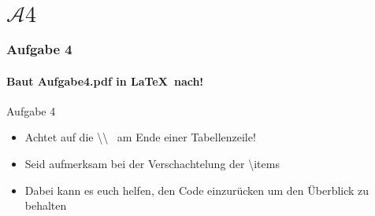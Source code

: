 \section{$\mathcal{A}4$} 
\begin{frame}
\frametitle{Aufgabe 4}
\framesubtitle{Baut Aufgabe4.pdf in \LaTeX ~nach!} 

\begin{block}{Aufgabe 4}
\begin{itemize}
  \item Achtet auf die \color{nounibaredII}\textbackslash \textbackslash  \color{black}~ am Ende einer Tabellenzeile!%
  \item Seid aufmerksam bei der Verschachtelung der \color{nounibaredII}\textbackslash item\color{black}s%
  \item Dabei kann es euch helfen, den Code einzur\"ucken um den \"Uberblick zu behalten%
\end{itemize}
\end{block}
\end{frame}